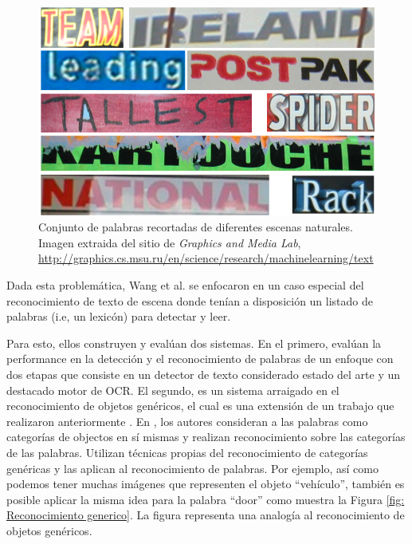 \begin{itemize}
	\begin{figure}[htbp]
		\centering
		\centerline{ \includegraphics[scale=0.30]{img/cropped_words.png} }
		\caption[Reconocimiento de palabras recortadas]{Conjunto de palabras recortadas de diferentes escenas naturales. Imagen extraida del sitio de \textit{Graphics and Media Lab}, \url{http://graphics.cs.msu.ru/en/science/research/machinelearning/text}}
		\label{fig: Reconocimiento palabras}
	\end{figure}
		
	\end{itemize}

	Dada esta problemática, Wang et al. se enfocaron en un caso especial del reconocimiento de texto de escena donde tenían a disposición un listado de palabras (i.e, un lexicón) para detectar y leer.
		
	Para esto, ellos construyen y evalúan dos sistemas. En el primero, evalúan la performance en la detección y el reconocimiento de palabras de un enfoque con dos etapas que consiste en un detector de texto considerado estado del arte y un destacado motor de OCR. El segundo, es un sistema arraigado en el reconocimiento de objetos genéricos, el cual es una extensión de un trabajo que realizaron anteriormente \cite{WB10}. En \cite{WB10}, los autores consideran a las palabras como categorías de objectos en sí mismas y realizan reconocimiento sobre las categorías de las palabras. Utilizan técnicas propias del reconocimiento de categorías genéricas y las aplican al reconocimiento de palabras. Por ejemplo, así como podemos tener muchas imágenes que representen el objeto ``vehículo'', también es posible aplicar la misma idea para la palabra ``door'' como muestra la Figura \ref{fig: Reconocimiento generico}. La figura representa una analogía al reconocimiento de objetos genéricos.
	
